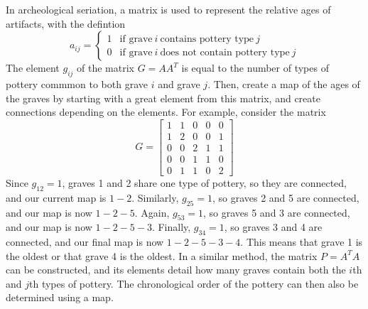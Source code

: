 \documentclass{article}
\begin{document}
    In archeological seriation, a matrix is used to represent the relative ages of artifacts,
    with the defintion 
    \[
    a_{ij} = \begin{cases}
        1 & \text{if grave} \ i \ \text{contains pottery type} \ j \\
        0 & \text{if grave} \ i \ \text{does not contain pottery type} \ j
    \end{cases}
    \] 
    The element $g_{ij}$ of the matrix $G = AA^T$ 
    is equal to the number of types of pottery commmon to both grave $i$ and grave $j$.
    Then, create a map of the ages of the graves by starting with a great element from this matrix,
    and create connections depending on the elements. 
    For example, consider the matrix 
    \[
    G = \begin{bmatrix}
        1 & 1 & 0 & 0 & 0 \\
        1 & 2 & 0 & 0 & 1 \\
        0 & 0 & 2 & 1 & 1 \\
        0 & 0 & 1 & 1 & 0 \\
        0 & 1 & 1 & 0 & 2
    \end{bmatrix}
    \]
    Since $g_{12} = 1$, graves 1 and 2 share one type of pottery, so they are connected, and our current map is $1-2$. 
    Similarly, $g_{25} = 1$, so graves 2 and 5 are connected, and our map is now $1-2-5$.
    Again, $g_{53} = 1$, so graves 5 and 3 are connected, and our map is now $1-2-5-3$.
    Finally, $g_{34} = 1$, so graves 3 and 4 are connected, and our final map is now $1-2-5-3-4$.
    This means that grave 1 is the oldest or that grave 4 is the oldest. 
    In a similar method, the matrix $P=A^TA$ can be constructed, 
    and its elements detail how many graves contain both the $i$th and $j$th types of pottery. 
    The chronological order of the pottery can then also be determined using a map. 
\end{document}
